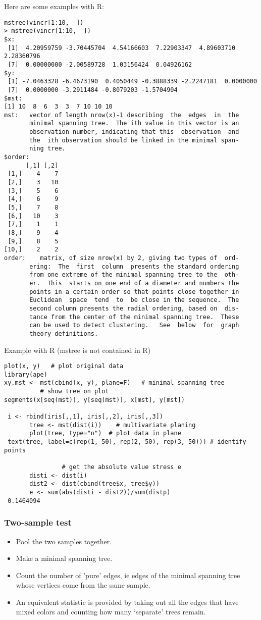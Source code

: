 \documentclass{article}
\begin{document}
Here are some examples with R:
{\small
\begin{verbatim}
mstree(vincr[1:10,  ])
> mstree(vincr[1:10,  ])
$x:
 [1]  4.20959759 -3.70445704  4.54166603  7.22903347  4.89603710  2.28360796
 [7]  0.00000000 -2.00589728  1.03156424  0.04926162
$y:
 [1] -7.0463328 -6.4673190  0.4050449 -0.3888339 -2.2247181  0.0000000
 [7]  0.0000000 -3.2911484 -0.8079203 -1.5704904
$mst:
[1] 10  8  6  3  3  7 10 10 10
mst:   vector of length nrow(x)-1 describing  the  edges  in  the
       minimal spanning tree.  The ith value in this vector is an
       observation number, indicating that this  observation  and
       the  ith observation should be linked in the minimal span-
       ning tree.
$order:
      [,1] [,2] 
 [1,]    4    7
 [2,]    3   10
 [3,]    5    6
 [4,]    6    9
 [5,]    7    8
 [6,]   10    3
 [7,]    1    1
 [8,]    9    4
 [9,]    8    5
[10,]    2    2
order:    matrix, of size nrow(x) by 2, giving two types of  ord-
       ering:  The  first  column  presents the standard ordering
       from one extreme of the minimal spanning tree to the  oth-
       er.  This  starts on one end of a diameter and numbers the
       points in a certain order so that points close together in
       Euclidean  space  tend  to  be close in the sequence.  The
       second column presents the radial ordering, based on  dis-
       tance from the center of the minimal spanning tree.  These
       can be used to detect clustering.   See  below  for  graph
       theory definitions.
\end{verbatim}
}
Example with R (mstree is not contained in R)
{\small
\begin{verbatim}
plot(x, y)   # plot original data
library(ape)
xy.mst <- mst(cbind(x, y), plane=F)   # minimal spanning tree
          # show tree on plot
segments(x[seq(mst)], y[seq(mst)], x[mst], y[mst])
 
 i <- rbind(iris[,,1], iris[,,2], iris[,,3])
       tree <- mst(dist(i))    # multivariate planing
       plot(tree, type="n")  # plot data in plane
 text(tree, label=c(rep(1, 50), rep(2, 50), rep(3, 50))) # identify points

                # get the absolute value stress e
       disti <- dist(i)
       dist2 <- dist(cbind(tree$x, tree$y))
       e <- sum(abs(disti - dist2))/sum(distp)
 0.1464094
\end{verbatim}
}
\subsubsection*{Two-sample test}
\begin{itemize}
\item Pool the two samples together.
\item Make a minimal spanning tree.
\item Count the number of 'pure' edges,
ie edges of the minimal spanning tree whose
vertices come from the same sample. 
\item An equivalent statistic is 
provided
by taking
out all the edges that have mixed colors
and counting how many `separate' trees remain.
\end{itemize}
\end{document}
